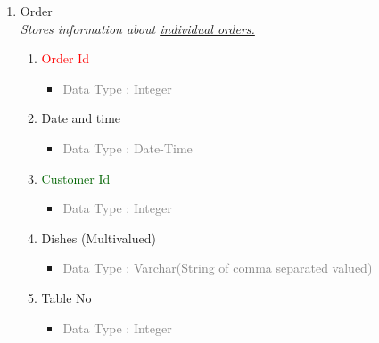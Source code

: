 \begin{enumerate}
        \item Order \\
        \textit{Stores information about \underline{individual orders.}}
            \begin{enumerate}[label=\alph*.]
                \item\textcolor{red}{Order Id}
                    \begin{itemize}[label=-]
                        \item \textcolor{gray}{Data Type : Integer}
                    \end{itemize}
                \item Date and time
                    \begin{itemize}[label=-]
                        \item \textcolor{gray}{Data Type : Date-Time}
                    \end{itemize}
                \item \textcolor{darkgreen}{Customer Id}
                    \begin{itemize}[label=-]
                        \item \textcolor{gray}{Data Type : Integer}
                    \end{itemize}
                \item Dishes (Multivalued)
                    \begin{itemize}[label=-]
                        \item \textcolor{gray}{Data Type : Varchar(String of comma separated valued)}
                    \end{itemize}
                \item Table No
                    \begin{itemize}[label=-]
                        \item \textcolor{gray}{Data Type : Integer}
                    \end{itemize}
            \end{enumerate}
        

\end{enumerate}

